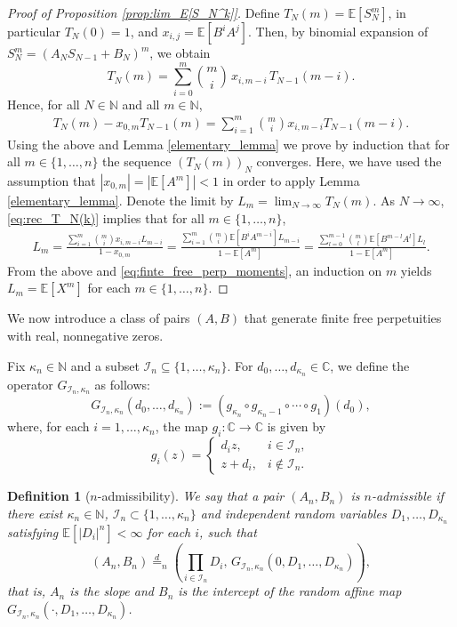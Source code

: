 \documentclass[a4paper,11pt]{amsart}
\numberwithin{equation}{section}
\newtheorem{definition}[theorem]{Definition}
\newcommand{\C}{\mathbb{C}}
\newcommand{\N}{\mathbb{N}}
\newcommand{\E}{\mathbb{E}}
\begin{document}
\begin{proof}[Proof of Proposition \ref{prop:lim_E[S_N^k]}]

Define $T_N(m)=\E[S_N^m]$, in particular $T_N(0)=1$, and $x_{i, j}=\E[B^iA^j]$. Then, by binomial expansion of $S_N^m=(A_N S_{N-1}+B_N)^m$, we obtain 
\[
T_N(m)=\sum_{i=0}^m \binom{m}{i}\,x_{i,m-i}\,T_{N-1}(m-i).
\]
Hence, for all $N\in\N$ and all $m\in\N$,
\begin{align}\label{eq:rec_T_N(k)}
T_N(m)-x_{0,m}T_{N-1}(m)=\sum_{i=1}^{m}\binom{m}{i}x_{i, m-i}T_{N-1}(m-i).
\end{align}
Using the above and Lemma \ref{elementary_lemma} we prove by induction that for all $m\in\{1,\dots,n\}$ the sequence $(T_N(m))_N$ converges. Here, we have used the assumption that $|x_{0,m}|=|\E[A^m]|<1$ in order to apply Lemma \ref{elementary_lemma}. Denote the limit by $L_m = \lim_{N \to \infty} T_N(m)$. As $N \to \infty$, \eqref{eq:rec_T_N(k)} implies that for all $m \in \{1, \dots, n\}$,
\begin{align*}
L_m=\frac{\sum_{i=1}^{m}\binom{m}{i}x_{i, m-i}L_{m-i}}{1-x_{0,m}}=\frac{\sum_{i=1}^{m}\binom{m}{i}\E[B^iA^{m-i}]L_{m-i}}{1-\E[A^m]}=\frac{\sum_{l=0}^{m-1}\binom{m}{l}\E[B^{m-l}A^l]L_{l}}{1-\E[A^m]}.
\end{align*}
From the above and \eqref{eq:finte_free_perp_moments}, an induction on $m$ yields $L_m=\E[X^m]$ for each $m \in \{1, \dots, n\}$.
\end{proof}
 
We now introduce a class of pairs \((A,B)\) that generate finite free perpetuities with real, nonnegative zeros. 

Fix $\kappa_n \in \N$ and a subset 
$\mathcal{I}_n \subseteq \{1,\dots,\kappa_n\}$. For
$d_0,\dots,d_{\kappa_n}\in\C$, we define the operator $G_{\mathcal{I}_n,\kappa_n}$ as follows:
\[
G_{\mathcal{I}_n,\kappa_n}(d_0,\dots,d_{\kappa_n})
    := (g_{\kappa_n}\circ g_{\kappa_n-1}\circ \cdots \circ g_1)(d_0),
\]
where, for each $i=1,\dots,\kappa_n$, the map 
$g_i\colon \C\to\C$ is given by
\[
g_i(z)=
\begin{cases}
d_i z, & i\in \mathcal{I}_n,\\
z+d_i, & i\notin \mathcal{I}_n.
\end{cases}
\]

\begin{definition}[$n$-admissibility]\label{def:n_admissibility} 
We say that a pair $(A_n,B_n)$ is $n$-admissible if there exist $\kappa_n\in\N$, $\mathcal{I}_n\subset \{1,\dots,\kappa_n\}$ and
independent random variables $D_1,\dots,D_{\kappa_n}$ satisfying
$\E[|D_i|^n]<\infty$ for each $i$, such that
\[
(A_n,B_n)\stackrel{d}{=}_n
\left(
\prod_{i\in\mathcal{I}_n}D_i,\,
G_{\mathcal{I}_n,\kappa_n}(0,D_1,\dots,D_{\kappa_n})
\right),
\]
that is, $A_n$ is the slope and $B_n$ is the intercept of the
random affine map $G_{\mathcal{I}_n,\kappa_n}(\cdot, D_1,\ldots,D_{\kappa_n})$.
\end{definition}
\end{document}
